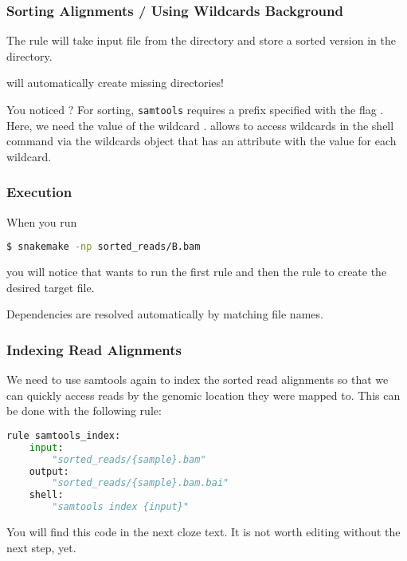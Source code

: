 \begin{frame}[fragile]
  \frametitle{Sorting Alignments / Using Wildcards Background}
  The rule will take  input file from the  directory and store a sorted version in the  directory.
  \pause
  \begin{docs}
  	\Snakemake{} will automatically create missing directories!
  \end{docs}
  You noticed ? 
  \pause
  For sorting, \texttt{samtools} requires a prefix specified with the flag . Here, we need the value of the wildcard . \Snakemake{} allows to access wildcards in the shell command via the wildcards object that has an attribute with the value for each wildcard.
\end{frame}

\begin{frame}[fragile]
  \frametitle{Execution}
  When you run 
  \begin{lstlisting}[language=Bash, style=Shell]
$ snakemake -np sorted_reads/B.bam
  \end{lstlisting}
  you will notice that \Snakemake{} wants to run the first rule  and then the rule  to create the desired target file.
  \begin{docs}
  	Dependencies are resolved automatically by matching file names.
  \end{docs}
\end{frame}

\begin{frame}[fragile]
  \frametitle{Indexing Read Alignments}
  We need to use samtools again to index the sorted read alignments so that we can quickly access reads by the genomic location they were mapped to. This can be done with the following rule:
  \begin{lstlisting}[language=Python,style=Python]
rule samtools_index:
    input:
        "sorted_reads/{sample}.bam"
    output:
        "sorted_reads/{sample}.bam.bai"
    shell:
        "samtools index {input}"
  \end{lstlisting}
  \begin{hint}[Note]
  	You will find this code in the next cloze text. It is not worth editing without the next step, yet.
  \end{hint}
\end{frame}

